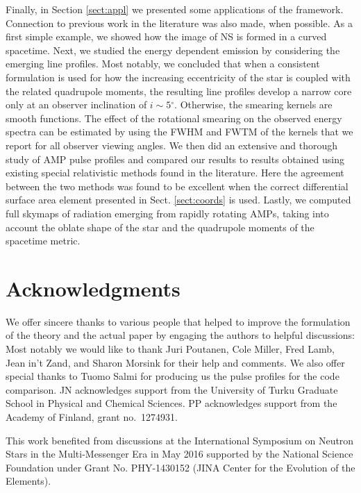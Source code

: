 \documentclass{aa}
\newcommand{\red}[1]{\textcolor{red}{#1}}
\newcommand{\refe}[1]{#1}
\renewcommand{\deg}{\ensuremath{^{\circ}}}
\begin{document}
Finally, in Section \ref{sect:appl} we presented some applications of the framework.
Connection to previous work in the literature was also made, when possible.
As a first simple example, we showed how the image of NS is formed in a curved spacetime.
Next, we studied the energy dependent emission by considering the emerging line profiles.
Most notably, we concluded that when a consistent formulation is used for how the increasing eccentricity of the star is coupled with the related quadrupole moments, \refe{the resulting line profiles develop a narrow core only at an observer inclination of $i \sim 5\deg$.}
\refe{Otherwise, the smearing kernels are smooth functions.}
\refe{The effect of the rotational smearing on the observed energy spectra can be estimated by using the FWHM and FWTM of the kernels that we report for all observer viewing angles.}
We then did an extensive and thorough study of AMP pulse profiles and compared our results to results obtained using existing special relativistic methods found in the literature.
Here the agreement between the two methods was found to be excellent \refe{when the correct differential surface area element presented in Sect. \ref{sect:coords} is used}.
Lastly, we computed full skymaps of radiation emerging from rapidly rotating AMPs, taking into account the oblate shape of the star and the quadrupole moments of the spacetime metric.



\section*{Acknowledgments}

\small{
We offer sincere thanks to various people that helped to improve the formulation of the theory and the actual paper by engaging the authors to helpful discussions: 
Most notably we would like to thank Juri Poutanen, Cole Miller, Fred Lamb, \refe{Jean in't Zand}, and Sharon Morsink for their help and comments.
We also offer special thanks to Tuomo Salmi for producing us the pulse profiles for the code comparison.
JN acknowledges support from the University of Turku Graduate School in Physical and Chemical Sciences.
PP acknowledges support from the Academy of Finland, grant no.~1274931.

This work benefited from discussions at the International Symposium on Neutron Stars in the Multi-Messenger Era in May 2016 supported by the National Science Foundation under Grant No. PHY-1430152 (JINA Center for the Evolution of the Elements).
}
\end{document}
